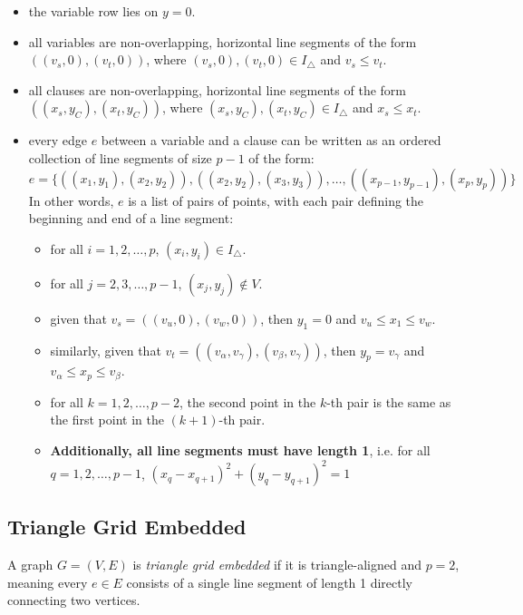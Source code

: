 \begin{itemize}
    \item the variable row lies on $y=0$.
    \item all variables are non-overlapping, horizontal line segments of the form $((v_s, 0), (v_t, 0))$,
    where $(v_s, 0), (v_t, 0)\in I_{\triangle}$ and $v_s \leq v_t$.
    \item all clauses are non-overlapping, horizontal line segments of the form $((x_s, y_C), (x_t, y_C))$,
    where $(x_s, y_C), (x_t, y_C)\in I_{\triangle}$ and $x_s \leq x_t$.
    \item every edge $e$ between a variable and a clause can be written as an ordered collection of line segments of size $p-1$ of the form:
    $$e = \{ \left( (x_1, y_1), (x_2, y_2) \right), \left( (x_2, y_2), (x_3, y_3) \right), \dots, \left( (x_{p-1}, y_{p-1}), (x_p, y_p) \right) \}$$
    In other words, $e$ is a list of pairs of points, with each pair defining the beginning and end of a line segment:
    \begin{itemize}[label=$\circ$]
        \item for all $i=1,2,\dots, p$, $(x_i, y_i) \in I_{\triangle}$.
        \item for all $j=2,3,\dots, p-1$, $(x_j, y_j) \notin V$.
        \item given that $v_s = ((v_{u}, 0), (v_{w}, 0))$, then $y_1=0$ and $v_u \leq x_1 \leq v_w$.
        \item similarly, given that $v_t = ((v_{\alpha}, v_\gamma), (v_{\beta}, v_\gamma))$,
        then $y_p=v_\gamma$ and $v_\alpha \leq x_p \leq v_\beta$.
        \item for all $k=1, 2, \dots, p-2$, the second point in the $k$-th pair is the same as the first point in the $(k+1)$-th pair.
        \item \textbf{Additionally, all line segments must have length 1}, i.e. \newline for all $q=1,2,\dots, p-1$, $(x_q - x_{q+1})^2 + (y_q - y_{q+1})^2 = 1$
    \end{itemize}
    
\end{itemize}

\subsection{Triangle Grid Embedded}

A graph $G=(V,E)$ is \textit{triangle grid embedded} if it is triangle-aligned and $p=2$, meaning every $e \in E$ consists of a single line segment of length 1 directly connecting two vertices.

